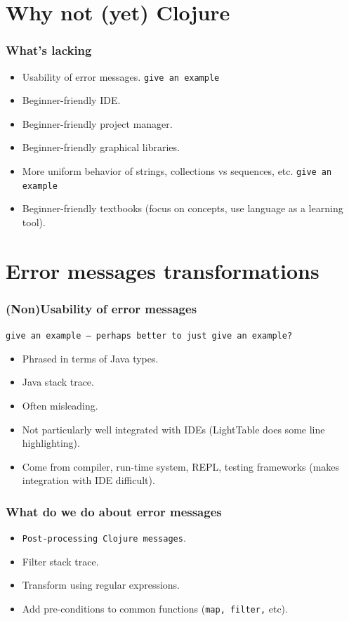 \documentclass{beamer}
\begin{document}
\section{Why {\bf not} (yet) Clojure}

\begin{frame}
   \frametitle{What's lacking}
\begin{itemize}
\item Usability of error messages. {\tt give an example}
\item Beginner-friendly IDE. 
\item Beginner-friendly project manager. 
\item Beginner-friendly graphical libraries. 
\item More uniform behavior of strings, collections vs sequences, etc.   {\tt give an example}
\item Beginner-friendly textbooks (focus on concepts, use language as a learning tool). 
\end{itemize}
\end{frame}

\section{Error messages transformations}
\begin{frame}
   \frametitle{(Non)Usability of error messages}
 {\tt give an example -- perhaps better to just give an example?}
\begin{itemize}
\item Phrased in terms of Java types.
\item Java stack trace. 
\item Often misleading. 
\item Not particularly well integrated with IDEs (LightTable does some line highlighting). 
\item Come from compiler, run-time system, REPL, testing frameworks (makes integration with IDE difficult). 
\end{itemize}
\end{frame}

\begin{frame}
   \frametitle { What do we do about error messages}
\begin{itemize}
\item {\tt Post-processing Clojure messages}. 
\item Filter stack trace.
\item Transform using regular expressions. 
\item Add pre-conditions to common functions ({\tt map, filter,} etc). 
\end{itemize}
\end{frame}
\end{document}

